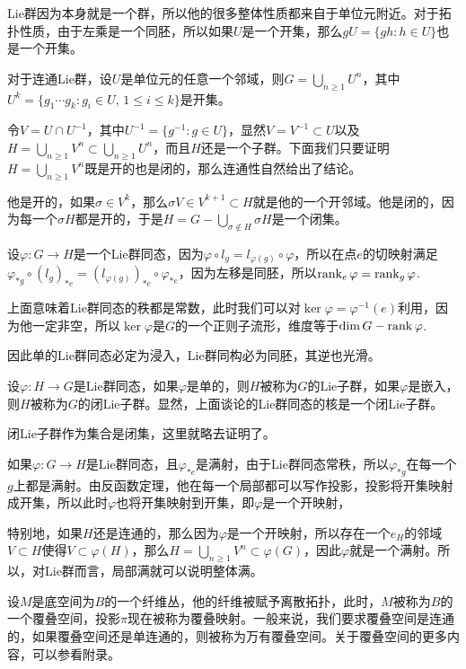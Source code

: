 Lie群因为本身就是一个群，所以他的很多整体性质都来自于单位元附近。对于拓扑性质，由于左乘是一个同胚，所以如果$U$是一个开集，那么$gU=\{gh:h\in U\}$也是一个开集。

\para 对于连通Lie群，设$U$是单位元的任意一个邻域，则$G=\bigcup_{n\geq 1}U^n$，其中$U^k=\{g_1\cdots g_k:g_i\in U,\, 1\leq i \leq k\}$是开集。

令$V=U\cap U^{-1}$，其中$U^{-1}=\{g^{-1}:g\in U\}$，显然$V=V^{-1}\subset U$以及$H=\bigcup_{n\geq 1}V^n\subset \bigcup_{n\geq 1}U^n$，而且$H$还是一个子群。下面我们只要证明$H=\bigcup_{n\geq 1}V^n$既是开的也是闭的，那么连通性自然给出了结论。

他是开的，如果$\sigma\in V^k$，那么$\sigma V\in V^{k+1}\subset H$就是他的一个开邻域。他是闭的，因为每一个$\sigma H$都是开的，于是$H=G-\bigcup_{\sigma\notin H}\sigma H$是一个闭集。

\para 设$\varphi:G\to H$是一个Lie群同态，因为$\varphi\circ l_g=l_{\varphi(g)}\circ \varphi$，所以在点$e$的切映射满足$\varphi_{*g}\circ (l_g)_{*e}=(l_{\varphi(g)})_{*e}\circ \varphi_{*e}$，因为左移是同胚，所以$\operatorname{rank}_e \varphi=\operatorname{rank}_g \varphi$.

上面意味着Lie群同态的秩都是常数，此时我们可以对$\ker \varphi=\varphi^{-1}(e)$利用，因为他一定非空，所以$\ker \varphi$是$G$的一个正则子流形，维度等于$\dim G-\operatorname{rank} \varphi$.

\para 因此单的Lie群同态必定为浸入，Lie群同构必为同胚，其逆也光滑。

\para 设$\varphi:H\to G$是Lie群同态，如果$\varphi$是单的，则$H$被称为$G$的Lie子群，如果$\varphi$是嵌入，则$H$被称为$G$的闭Lie子群。显然，上面谈论的Lie群同态的核是一个闭Lie子群。

闭Lie子群作为集合是闭集，这里就略去证明了。

\para 如果$\varphi:G\to H$是Lie群同态，且$\varphi_{*e}$是满射，由于Lie群同态常秩，所以$\varphi_{*g}$在每一个$g$上都是满射。由反函数定理，他在每一个局部都可以写作投影，投影将开集映射成开集，所以此时$\varphi$也将开集映射到开集，即$\varphi$是一个开映射，

特别地，如果$H$还是连通的，那么因为$\varphi$是一个开映射，所以存在一个$e_H$的邻域$V\subset H$使得$V\subset \varphi(H)$，那么$H=\bigcup_{n\geq 1}V^n\subset \varphi(G)$，因此$\varphi$就是一个满射。所以，对Lie群而言，局部满就可以说明整体满。

\para \label{covering_space}设$M$是底空间为$B$的一个纤维丛，他的纤维被赋予离散拓扑，此时，$M$被称为$B$的一个覆叠空间，投影$\pi$现在被称为覆叠映射。一般来说，我们要求覆叠空间是连通的，如果覆叠空间还是单连通的，则被称为万有覆叠空间。关于覆叠空间的更多内容，可以参看附录。

